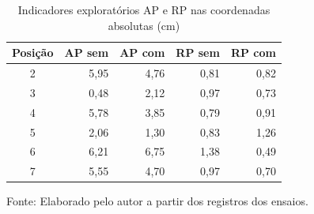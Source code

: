 \begin{table}[H]\centering
\caption{Indicadores exploratórios AP e RP nas coordenadas absolutas (cm)}\label{tab:reanalise-ap-rp}
\small\begin{tabular}{crrrr}\toprule
Posição & AP sem & AP com & RP sem & RP com\\\midrule
2 & 5,95 & 4,76 & 0,81 & 0,82\\
3 & 0,48 & 2,12 & 0,97 & 0,73\\
4 & 5,78 & 3,85 & 0,79 & 0,91\\
5 & 2,06 & 1,30 & 0,83 & 1,26\\
6 & 6,21 & 6,75 & 1,38 & 0,49\\
7 & 5,55 & 4,70 & 0,97 & 0,70\\
\bottomrule\end{tabular}\par\smallskip
{\footnotesize Fonte: Elaborado pelo autor a partir dos registros dos ensaios.}\end{table}
